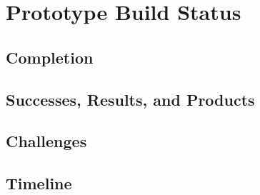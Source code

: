 \documentclass{../tex/report}
\begin{document}
\clearpage



\clearpage



\clearpage



\clearpage



\clearpage




% 

\section{Prototype Build Status}

\subsection{Completion}


\subsection{Successes, Results, and Products}


\subsection{Challenges}


\subsection{Timeline}
\end{document}
